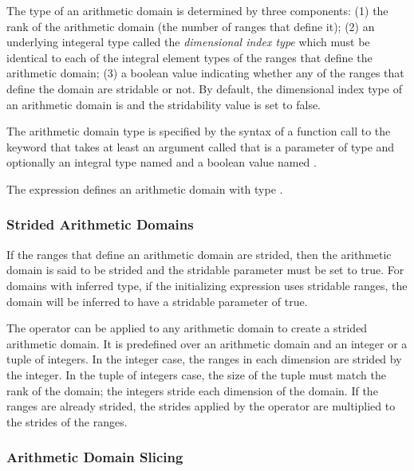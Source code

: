 The type of an arithmetic domain is determined by three components:
(1) the rank of the arithmetic domain (the number of ranges that
define it); (2) an underlying integeral type called the
\emph{dimensional index type} which must be identical to each of the
integral element types of the ranges that define the arithmetic
domain; (3) a boolean value indicating whether any of the ranges that
define the domain are stridable or not.  By default, the dimensional
index type of an arithmetic domain is  and the stridability
value is set to false.

The arithmetic domain type is specified by the syntax of a function
call to the keyword  that takes at least an argument
called  that is a parameter of type  and
optionally an integral type named  and a boolean value
named .

\begin{example}
The expression \chpl{[1..5, 1..5]} defines an arithmetic domain with
type .
\end{example}

\subsubsection{Strided Arithmetic Domains}
\label{Strided_Arithmetic_Domains_and_Arrays}

If the ranges that define an arithmetic domain are strided, then the
arithmetic domain is said to be strided and the stridable parameter
must be set to true.  For domains with inferred type, if the
initializing expression uses stridable ranges, the domain will be
inferred to have a stridable parameter of true.

The  operator can be applied to any arithmetic domain to
create a strided arithmetic domain.  It is predefined over an
arithmetic domain and an integer or a tuple of integers.  In the
integer case, the ranges in each dimension are strided by the integer.
In the tuple of integers case, the size of the tuple must match the
rank of the domain; the integers stride each dimension of the domain.
If the ranges are already strided, the strides applied by
the  operator are multiplied to the strides of the ranges.

\subsubsection{Arithmetic Domain Slicing}
\label{Arithmetic_Domain_Slicing}

